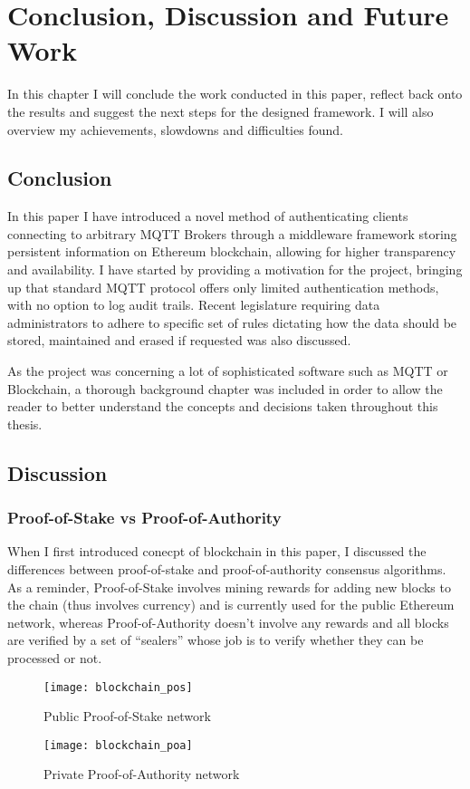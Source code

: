 \chapter{Conclusion, Discussion and Future Work\label{chap:discussion}}
In this chapter I will conclude the work conducted in this paper, reflect back onto the results and suggest the next steps for the designed framework. I will also overview my achievements, slowdowns and difficulties found.

\section{Conclusion}
In this paper I have introduced a novel method of authenticating clients connecting to arbitrary MQTT Brokers through a middleware framework storing persistent information on Ethereum blockchain, allowing for higher transparency and availability. I have started by providing a motivation for the project, bringing up that standard MQTT protocol offers only limited authentication methods, with no option to log audit trails. Recent legislature requiring data administrators to adhere to specific set of rules dictating how the data should be stored, maintained and erased if requested was also discussed.

As the project was concerning a lot of sophisticated software such as MQTT or Blockchain, a thorough background chapter was included in order to allow the reader to better understand the concepts and decisions taken throughout this thesis.

\section{Discussion}

\subsection{Proof-of-Stake vs Proof-of-Authority}
When I first introduced conecpt of blockchain in this paper, I discussed the differences between proof-of-stake and proof-of-authority consensus algorithms. As a reminder, Proof-of-Stake involves mining rewards for adding new blocks to the chain (thus involves currency) and is currently used for the public Ethereum network, whereas Proof-of-Authority doesn't involve any rewards and all blocks are verified by a set of ``sealers'' whose job is to verify whether they can be processed or not.

\begin{figure}[h]
    \centering
    \texttt{[image: blockchain\_pos]}
    \caption{Public Proof-of-Stake network}
    \label{fig:blockchain_pos}
\end{figure}
\begin{figure}[h]
    \centering
    \texttt{[image: blockchain\_poa]}
    \caption{Private Proof-of-Authority network}
    \label{fig:blockchain_poa}
\end{figure}

